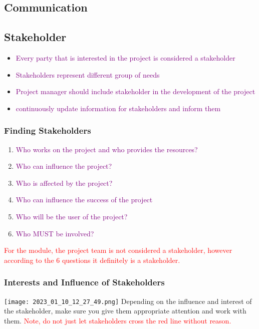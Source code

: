 \documentclass[main.tex,fontsize=12pt,paper=a4,paper=landscape,DIV=calc,]{scrartcl}
\begin{document}
\begin{multicols*}{2}
\section{Communication}
\subsection{Stakeholder}
\begin{itemize}
\item \textcolor{purple}{Every party that is interested in the project is considered a stakeholder}
\item \textcolor{purple}{Stakeholders represent different group of needs}
\item \textcolor{purple}{Project manager should include stakeholder in the development of the project}
\item \textcolor{purple}{continuously update information for stakeholders and inform them}
\end{itemize} 

\subsubsection{Finding Stakeholders}
\begin{enumerate}
\item \textcolor{purple}{Who works on the project and who provides the resources?}
\item \textcolor{purple}{Who can influence the project?}
\item \textcolor{purple}{Who is affected by the project?}
\item \textcolor{purple}{Who can influence the success of the project}
\item \textcolor{purple}{Who will be the user of the project?}
\item \textcolor{purple}{Who MUST be involved?}
\end{enumerate}
\textcolor{red}{For the module, the project team is not considered a stakeholder, however according to the 6 questions it definitely is a stakeholder.}

\subsubsection{Interests and Influence of Stakeholders}
\texttt{[image: 2023\_01\_10\_12\_27\_49.png]}\newline
Depending on the influence and interest of the stakeholder, make sure you give them appropriate attention and work with them.\newline
\textcolor{red}{Note, do not just let stakeholders cross the red line without reason.}


\end{multicols*}
\end{document}
